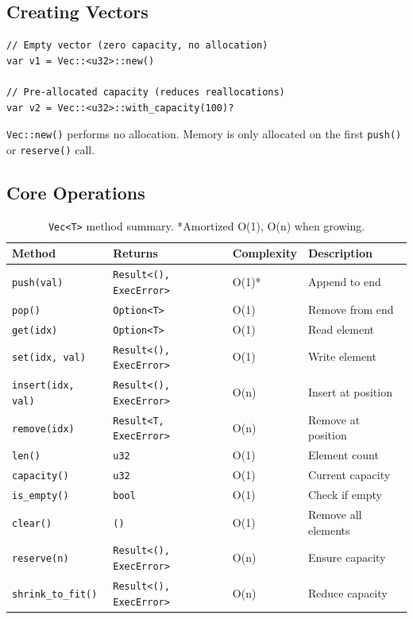 \subsection{Creating Vectors}

\begin{lstlisting}
// Empty vector (zero capacity, no allocation)
var v1 = Vec::<u32>::new()

// Pre-allocated capacity (reduces reallocations)
var v2 = Vec::<u32>::with_capacity(100)?
\end{lstlisting}

\begin{notebox}
\texttt{Vec::new()} performs no allocation. Memory is only allocated on the first \texttt{push()} or \texttt{reserve()} call.
\end{notebox}

\subsection{Core Operations}

\begin{table}[h]
\centering
\begin{tabular}{llll}
\textbf{Method} & \textbf{Returns} & \textbf{Complexity} & \textbf{Description} \\
\hline
\texttt{push(val)} & \texttt{Result<(), ExecError>} & O(1)* & Append to end \\
\texttt{pop()} & \texttt{Option<T>} & O(1) & Remove from end \\
\texttt{get(idx)} & \texttt{Option<T>} & O(1) & Read element \\
\texttt{set(idx, val)} & \texttt{Result<(), ExecError>} & O(1) & Write element \\
\texttt{insert(idx, val)} & \texttt{Result<(), ExecError>} & O(n) & Insert at position \\
\texttt{remove(idx)} & \texttt{Result<T, ExecError>} & O(n) & Remove at position \\
\texttt{len()} & \texttt{u32} & O(1) & Element count \\
\texttt{capacity()} & \texttt{u32} & O(1) & Current capacity \\
\texttt{is\_empty()} & \texttt{bool} & O(1) & Check if empty \\
\texttt{clear()} & \texttt{()} & O(1) & Remove all elements \\
\texttt{reserve(n)} & \texttt{Result<(), ExecError>} & O(n) & Ensure capacity \\
\texttt{shrink\_to\_fit()} & \texttt{Result<(), ExecError>} & O(n) & Reduce capacity \\
\end{tabular}
\caption{\texttt{Vec<T>} method summary. *Amortized O(1), O(n) when growing.}
\end{table}


